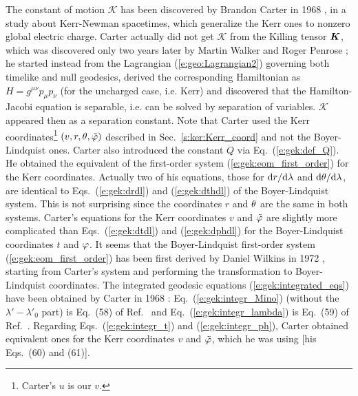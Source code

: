 


\begin{hist} \label{h:gek:eom_Carter}
The constant of motion $\mathscr{K}$ has been discovered by Brandon Carter
in 1968 \cite{Carte68a}, in a study about  Kerr-Newman spacetimes,
which generalize the Kerr ones to nonzero global electric charge.
Carter actually did not get $\mathscr{K}$ from the Killing tensor $\bm{K}$,
which was discovered only two years later by Martin Walker and
Roger Penrose \cite{WalkeP70}; he
started instead from the Lagrangian (\ref{e:geo:Lagrangian2}) governing
both timelike and null geodesics,
derived the corresponding
Hamiltonian as $H = g^{\mu\nu} p_\mu p_\nu$ (for the uncharged case, i.e. Kerr)
and discovered that the Hamilton-Jacobi equation
is separable, i.e. can be solved by separation of variables.
$\mathscr{K}$ appeared then as a separation constant. Note that Carter used
the Kerr coordinates\footnote{Carter's $u$ is our $v$.}
$(v,r,\theta,{\tilde\varphi})$ described in Sec.~\ref{s:ker:Kerr_coord}
and not the Boyer-Lindquist ones.
Carter also introduced
the constant $Q$ via Eq.~(\ref{e:gek:def_Q}). He obtained the equivalent
of the first-order system (\ref{e:gek:eom_first_order}) for the Kerr coordinates. Actually
two of his equations, those for $\mathrm{d} r/\mathrm{d}\lambda$ and $\mathrm{d}\theta/\mathrm{d}\lambda$, are
identical to Eqs.~(\ref{e:gek:drdl}) and (\ref{e:gek:dthdl}) of the Boyer-Lindquist
system. This is not surprising since the coordinates
$r$ and $\theta$ are the same in both systems. Carter's equations for the
Kerr coordinates $v$ and ${\tilde\varphi}$ are slightly more complicated than
Eqs.~(\ref{e:gek:dtdl}) and (\ref{e:gek:dphdl}) for the Boyer-Lindquist coordinates
$t$ and $\varphi$. It seems that the Boyer-Lindquist first-order system (\ref{e:gek:eom_first_order})
has been first derived by Daniel Wilkins in 1972 \cite{Wilki72},
starting from Carter's system and performing the transformation to Boyer-Lindquist
coordinates. The integrated geodesic equations (\ref{e:gek:integrated_eqs}) have
been obtained by Carter in 1968 \cite{Carte68a}: Eq.~(\ref{e:gek:integr_Mino})
(without the $\lambda' - \lambda'_0$ part) is Eq.~(58) of Ref.~\cite{Carte68a}
and Eq.~(\ref{e:gek:integr_lambda}) is Eq.~(59) of Ref.~\cite{Carte68a}.
Regarding Eqs.~(\ref{e:gek:integr_t}) and (\ref{e:gek:integr_ph}), Carter
obtained equivalent ones for the Kerr coordinates $v$ and ${\tilde\varphi}$, which he was using
[his Eqs.~(60) and (61)].
\end{hist}

